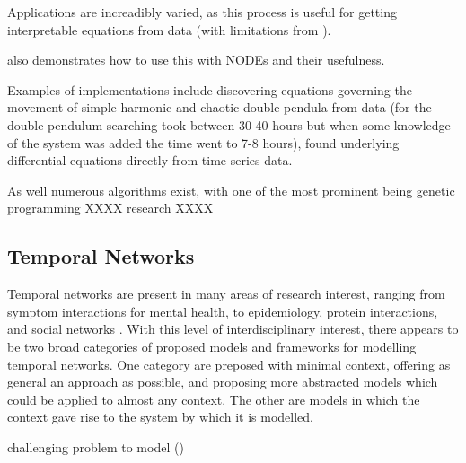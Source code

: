 \documentclass[12pt]{article}
\begin{document}
    Applications are increadibly varied, as this process is useful for getting interpretable equations from data (with limitations from \cite{kidger2022neural}).

    \cite{kidger2022neural} also demonstrates how to use this with NODEs and their usefulness.

    Examples of implementations include discovering equations governing the movement of simple harmonic and chaotic double pendula from data \cite{schmidt2009distilling}(for the double pendulum searching took between 30-40 hours but when some knowledge of the system was added the time went to 7-8 hours), found underlying differential equations directly from time series data\cite{bongard2007automated}.  

    As well numerous algorithms exist, with one of the most prominent being genetic programming XXXX research XXXX

\subsection{Temporal Networks}
    Temporal networks are present in many areas of research interest, ranging from symptom interactions for mental health, to epidemiology, protein interactions, and social networks \cite{jordan2020current,contreras2020temporal,lucas2021inferring,jin2009identifying,masuda2013predicting,moinet2015burstiness,hanneke2010discrete}. With this level of interdisciplinary interest, there appears to be two broad categories of proposed models and frameworks for modelling temporal networks. One category are preposed with minimal context, offering as general an approach as possible\cite{HOLME201297,KARIMI20133476}, and proposing more abstracted models which could be applied to almost any context. The other are models in which the context gave rise to the system by which it is modelled\cite{zhangSpatioTempFlow2020,jordan2020current,moinetEffectOfRisk2018,caballero2017real}.

    challenging problem to model ()

    \printbibliography
\end{document}
